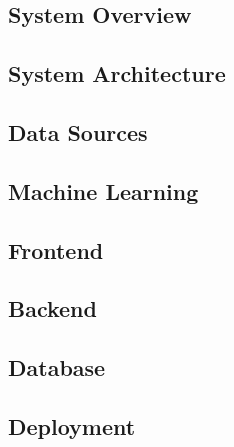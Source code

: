 \subsection{System Overview}


\subsection{System Architecture}


\subsection{Data Sources}


\subsection{Machine Learning}


\subsection{Frontend}


\subsection{Backend}


\subsection{Database}


\subsection{Deployment}

